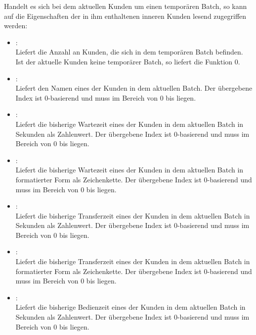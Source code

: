 Handelt es sich bei dem aktuellen Kunden um einen temporären Batch, so kann auf die
Eigenschaften der in ihm enthaltenen inneren Kunden lesend zugegriffen werden:

\begin{itemize}

\item
{}:\\
Liefert die Anzahl an Kunden, die sich in dem temporären Batch befinden.
Ist der aktuelle Kunden keine temporärer Batch, so liefert die Funktion 0.

\item
{}:\\
Liefert den Namen eines der Kunden in dem aktuellen Batch.
Der übergebene Index ist 0-basierend und muss im Bereich von 0 bis  liegen.

\item
{}:\\
Liefert die bisherige Wartezeit eines der Kunden in dem aktuellen Batch in Sekunden als Zahlenwert.
Der übergebene Index ist 0-basierend und muss im Bereich von 0 bis  liegen.
	

\item
{}:\\
Liefert die bisherige Wartezeit eines der Kunden in dem aktuellen Batch in formatierter Form als Zeichenkette.
Der übergebene Index ist 0-basierend und muss im Bereich von 0 bis  liegen.

\item
{}:\\
Liefert die bisherige Transferzeit eines der Kunden in dem aktuellen Batch in Sekunden als Zahlenwert.
Der übergebene Index ist 0-basierend und muss im Bereich von 0 bis  liegen.

\item
{}:\\
Liefert die bisherige Transferzeit eines der Kunden in dem aktuellen Batch in formatierter Form als Zeichenkette.
Der übergebene Index ist 0-basierend und muss im Bereich von 0 bis  liegen.

\item
{}:\\
Liefert die bisherige Bedienzeit eines der Kunden in dem aktuellen Batch in Sekunden als Zahlenwert.
Der übergebene Index ist 0-basierend und muss im Bereich von 0 bis  liegen.


\end{itemize}
